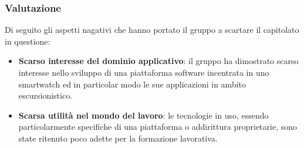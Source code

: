 \subsubsection{Valutazione}
Di seguito gli aspetti nagativi che hanno portato il gruppo a scartare il capitolato in questione:
\begin{itemize}
\item \textbf{Scarso interesse del dominio applicativo}: il gruppo ha dimostrato scarso interesse nello sviluppo di una piattaforma software incentrata in uno smartwatch ed in particolar modo le sue applicazioni in ambito escursionistico.
\item \textbf{Scarsa utilità nel mondo del lavoro}: le tecnologie in uso, essendo particolarmente specifiche di una piattaforma o addirittura proprietarie, sono state ritenuto poco adette per la formazione lavorativa.
\end{itemize}